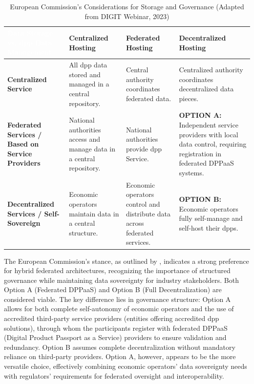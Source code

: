 \begin{table}[htbp]
    \centering
    \caption{European Commission's Considerations for Storage and Governance (Adapted from DIGIT Webinar, 2023)}
    \renewcommand{\arraystretch}{1.5}
    \begin{tabularx}{\linewidth}{
        |>{\centering\arraybackslash}X
        |>{\centering\arraybackslash}X
        |>{\centering\arraybackslash}X
        |>{\centering\arraybackslash}X|}
        \hline
        \cellcolor{myDarkBlue}\textcolor{white}{\textbf{Data Storage vs. \ac{dpp} Data Management}} &
        \cellcolor{myGrey}\textbf{Centralized Hosting} &
        \cellcolor{myGrey}\textbf{Federated Hosting} &
        \cellcolor{myGrey}\textbf{Decentralized Hosting} \\
        \hline
        \cellcolor{myGrey}\textbf{Centralized Service} & 
        \cellcolor{Salmon}All \ac{dpp} data stored and managed in a central repository. & 
        \cellcolor{Mahogany}Central authority coordinates federated data. & 
        \cellcolor{Mahogany}Centralized authority coordinates decentralized data pieces. \\
        \hline
        \cellcolor{myGrey}\textbf{Federated Services / Based on Service Providers} & 
        \cellcolor{Mahogany}National authorities access and manage data in a central repository. & 
        \cellcolor{Salmon}National authorities provide \ac{dpp} Service. & 
        \cellcolor{Goldenrod}\textbf{OPTION A:} Independent service providers with local data control, requiring registration in federated DPPaaS systems. \\
        \hline
        \cellcolor{myGrey}\textbf{Decentralized Services / Self-Sovereign} & 
        \cellcolor{Mahogany}Economic operators maintain data in a central structure. & 
        \cellcolor{Mahogany}Economic operators control and distribute data across federated services. & 
        \cellcolor{Goldenrod}\textbf{OPTION B:} Economic operators fully self-manage and self-host their \ac{dpp}s. \\
        \hline
    \end{tabularx}
    \label{tab:dpp_storage_data_management_DIGIT}
\end{table}

The European Commission’s stance, as outlined by \textcite{Frade.2023}, indicates a strong preference for hybrid federated architectures, recognizing the importance of structured governance while maintaining data sovereignty for industry stakeholders. Both Option A (Federated DPPaaS) and Option B (Full Decentralization) are considered viable. The key difference lies in governance structure: Option A allows for both complete self-autonomy of economic operators and the use of accredited third-party service providers (entities offering accredited \ac{dpp} solutions), through whom the participants register with federated DPPaaS (Digital Product Passport as a Service) providers to ensure validation and redundancy. Option B assumes complete decentralization without mandatory reliance on third-party providers. Option A, however, appears to be the more versatile choice, effectively combining economic operators' data sovereignty needs with regulators' requirements for federated oversight and interoperability.

